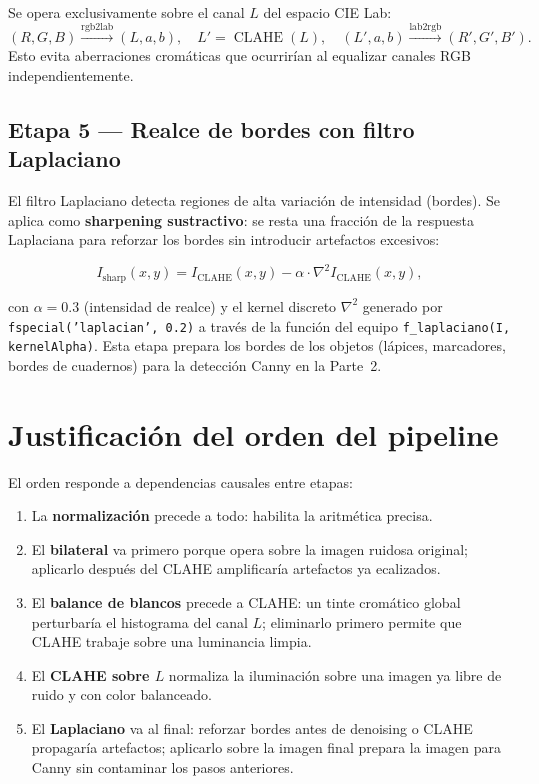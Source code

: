 \documentclass[11pt,a4paper]{article}
\begin{document}
Se opera exclusivamente sobre el canal \(L\) del espacio CIE Lab:
\begin{equation}
    (R,G,B) \xrightarrow{\text{rgb2lab}} (L,a,b),\quad
    L' = \operatorname{CLAHE}(L),\quad
    (L',a,b) \xrightarrow{\text{lab2rgb}} (R',G',B').
\end{equation}
Esto evita aberraciones cromáticas que ocurrirían al equalizar canales RGB independientemente.

\subsection{Etapa 5 — Realce de bordes con filtro Laplaciano}
\label{sec:laplaciano}

El filtro Laplaciano detecta regiones de alta variación de intensidad (bordes). Se
aplica como \textbf{sharpening sustractivo}: se resta una fracción de la respuesta
Laplaciana para reforzar los bordes sin introducir artefactos excesivos:

\begin{equation}
    I_{\text{sharp}}(x,y) = I_{\text{CLAHE}}(x,y) - \alpha \cdot \nabla^2 I_{\text{CLAHE}}(x,y),
    \label{eq:laplacian}
\end{equation}

con \(\alpha = 0.3\) (intensidad de realce) y el kernel discreto \(\nabla^2\)
generado por \texttt{fspecial('laplacian', 0.2)} a través de la función del equipo
\texttt{f\_laplaciano(I, kernelAlpha)}. Esta etapa prepara los bordes de los objetos
(lápices, marcadores, bordes de cuadernos) para la detección Canny en la Parte~2.

\section{Justificación del orden del pipeline}
\label{sec:orden}

El orden responde a dependencias causales entre etapas:

\begin{enumerate}
    \item La \textbf{normalización} precede a todo: habilita la aritmética precisa.
    \item El \textbf{bilateral} va primero porque opera sobre la imagen ruidosa original;
          aplicarlo después del CLAHE amplificaría artefactos ya ecalizados.
    \item El \textbf{balance de blancos} precede a CLAHE: un tinte cromático global
          perturbaría el histograma del canal \(L\); eliminarlo primero permite que
          CLAHE trabaje sobre una luminancia limpia.
    \item El \textbf{CLAHE sobre \(L\)} normaliza la iluminación sobre una imagen ya
          libre de ruido y con color balanceado.
    \item El \textbf{Laplaciano} va al final: reforzar bordes antes de denoising o
          CLAHE propagaría artefactos; aplicarlo sobre la imagen final prepara la
          imagen para Canny sin contaminar los pasos anteriores.
\end{enumerate}
\end{document}
